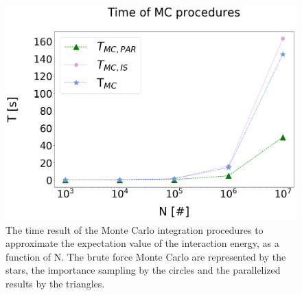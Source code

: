 \documentclass[%
reprint,
amsmath,amssymb,
aps,
]{revtex4-1}
\begin{document}
\begin{figure}[H]
	\includegraphics[scale = 0.2]{MC_time.png}
	\caption{\label{mc_time} The time result of the Monte Carlo integration procedures to approximate the expectation value of the interaction energy, as a function of N. The brute force Monte Carlo are represented by the stars, the importance sampling by the circles and the parallelized results by the triangles. }
\end{figure} \newpage 
\end{document}
